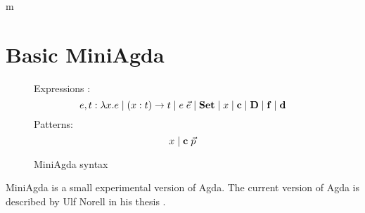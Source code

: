 m\chapter{Basic MiniAgda}

\newcommand{\dd}{\mathbf{d}}
\newcommand{\DD}{\mathbf{D}}
\newcommand{\cc}{\mathbf{c}}
\newcommand{\ff}{\mathbf{f}}

\begin{figure}
\caption{MiniAgda syntax}
Expressions : \[e,t :  \lam x . e \vsp \EPi{x}{t}{t} \vsp e \; \vec{e} \vsp  \Set \vsp x \vsp \cc \vsp \DD \vsp \ff \vsp \dd\]
Patterns: \[ x  \vsp \cc \; \vec{p} \]
\end{figure}

MiniAgda is a small experimental version of Agda.
The current version of Agda is described by Ulf Norell in his thesis \cite{norell:thesis}.
